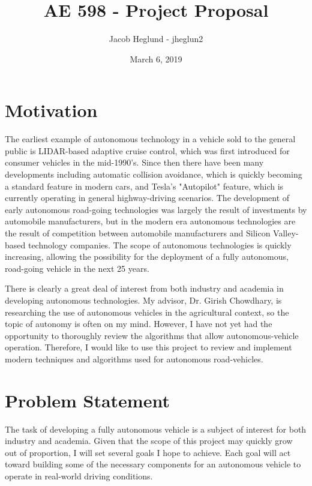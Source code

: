 \documentclass[11pt]{article}
\title{AE 598 - Project Proposal}
\author{Jacob Heglund - jheglun2}
\date{March 6, 2019}
\begin{document}
\maketitle

\section{Motivation}
The earliest example of autonomous technology in a vehicle sold to the general public is LIDAR-based adaptive cruise control, which was first introduced for consumer vehicles in the mid-1990's.  Since then there have been many developments including automatic collision avoidance, which is quickly becoming a standard feature in modern cars, and Tesla's "Autopilot" feature, which is currently operating in general highway-driving scenarios.  The development of early autonomous road-going technologies was largely the result of investments by automobile manufacturers, but in the modern era autonomous technologies are the result of competition between automobile manufacturers and Silicon Valley-based technology companies.  The scope of autonomous technologies is quickly increasing, allowing the possibility for the deployment of a fully autonomous, road-going vehicle in the next 25 years.

There is clearly a great deal of interest from both industry and academia in developing autonomous technologies.  My advisor, Dr. Girish Chowdhary, is researching the use of autonomous vehicles in the agricultural context, so the topic of autonomy is often on my mind.  However, I have not yet had the opportunity to thoroughly review the algorithms that allow autonomous-vehicle operation.  Therefore, I would like to use this project to review and implement modern techniques and algorithms used for autonomous road-vehicles.

\section{Problem Statement}
The task of developing a fully autonomous vehicle is a subject of interest for both industry and academia.  Given that the scope of this project may quickly grow out of proportion, I will set several goals I hope to achieve. Each goal will act toward building some of the necessary components for an autonomous vehicle to operate in real-world driving conditions.
\end{document}
